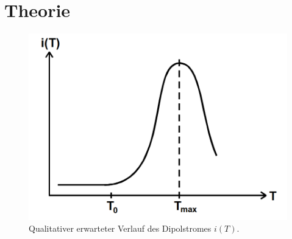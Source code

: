 \section{Theorie}
\label{sec:Theorie}

\begin{figure}
  \includegraphics{./logos/Strom_theorie.PNG}
  \caption{Qualitativer erwarteter Verlauf des Dipolstromes $i(T)$.\cite{Anleitung}}
  \label{fig:strom-theo}
\end{figure}

